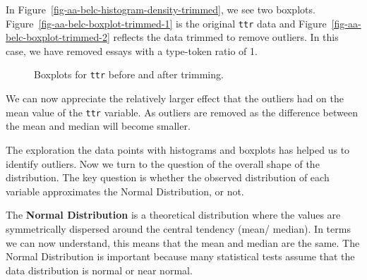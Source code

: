 \documentclass[
  letterpaper,
  DIV=11,
  numbers=noendperiod]{scrreport}
\theoremstyle{definition}
\theoremstyle{remark}
\begin{document}
In Figure~\ref{fig-aa-belc-histogram-density-trimmed}, we see two
boxplots. Figure~\ref{fig-aa-belc-boxplot-trimmed-1} is the original
\texttt{ttr} data and Figure~\ref{fig-aa-belc-boxplot-trimmed-2}
reflects the data trimmed to remove outliers. In this case, we have
removed essays with a type-token ratio of 1.

\begin{figure}

\begin{minipage}[t]{0.50\linewidth}

{\centering 


}

\end{minipage}%
%
\begin{minipage}[t]{0.50\linewidth}

{\centering 


}

\end{minipage}%

\caption{\label{fig-aa-belc-boxplot-trimmed}Boxplots for \texttt{ttr}
before and after trimming.}

\end{figure}

We can now appreciate the relatively larger effect that the outliers had
on the mean value of the \texttt{ttr} variable. As outliers are removed
as the difference between the mean and median will become smaller.

The exploration the data points with histograms and boxplots has helped
us to identify outliers. Now we turn to the question of the overall
shape of the distribution. The key question is whether the observed
distribution of each variable approximates the Normal Distribution, or
not.

The \textbf{Normal Distribution} is a theoretical distribution where the
values are symmetrically dispersed around the central tendency (mean/
median). In terms we can now understand, this means that the mean and
median are the same. The Normal Distribution is important because many
statistical tests assume that the data distribution is normal or near
normal.
\end{document}
